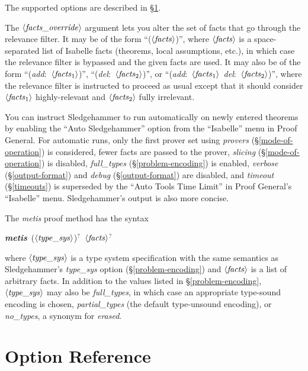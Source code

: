 \documentclass[a4paper,12pt]{article}
\def\qty#1{\ensuremath{\left<\mathit{#1\/}\right>}}
\begin{document}
The supported options are described in \S\ref{option-reference}.

The \qty{facts\_override} argument lets you alter the set of facts that go
through the relevance filter. It may be of the form ``(\qty{facts})'', where
\qty{facts} is a space-separated list of Isabelle facts (theorems, local
assumptions, etc.), in which case the relevance filter is bypassed and the given
facts are used. It may also be of the form ``(\textit{add}:\ \qty{facts\/_{\mathrm{1}}})'',
``(\textit{del}:\ \qty{facts\/_{\mathrm{2}}})'', or ``(\textit{add}:\ \qty{facts\/_{\mathrm{1}}}\
\textit{del}:\ \qty{facts\/_{\mathrm{2}}})'', where the relevance filter is instructed to
proceed as usual except that it should consider \qty{facts\/_{\mathrm{1}}}
highly-relevant and \qty{facts\/_{\mathrm{2}}} fully irrelevant.

You can instruct Sledgehammer to run automatically on newly entered theorems by
enabling the ``Auto Sledgehammer'' option from the ``Isabelle'' menu in Proof
General. For automatic runs, only the first prover set using \textit{provers}
(\S\ref{mode-of-operation}) is considered, fewer facts are passed to the prover,
\textit{slicing} (\S\ref{mode-of-operation}) is disabled, \textit{full\_types}
(\S\ref{problem-encoding}) is enabled, \textit{verbose} (\S\ref{output-format})
and \textit{debug} (\S\ref{output-format}) are disabled, and \textit{timeout}
(\S\ref{timeouts}) is superseded by the ``Auto Tools Time Limit'' in Proof
General's ``Isabelle'' menu. Sledgehammer's output is also more concise.

The \textit{metis} proof method has the syntax

\prew
\textbf{\textit{metis}}~(\qty{type\_sys})${}^?$~\qty{facts}${}^?$
\postw

where \qty{type\_sys} is a type system specification with the same semantics as
Sledgehammer's \textit{type\_sys} option (\S\ref{problem-encoding}) and
\qty{facts} is a list of arbitrary facts. In addition to the values listed in
\S\ref{problem-encoding}, \qty{type\_sys} may also be \textit{full\_types}, in
which case an appropriate type-sound encoding is chosen, \textit{partial\_types}
(the default type-unsound encoding), or \textit{no\_types}, a synonym for
\textit{erased}.

\section{Option Reference}
\label{option-reference}

\def\defl{\{}
\def\defr{\}}
\end{document}

